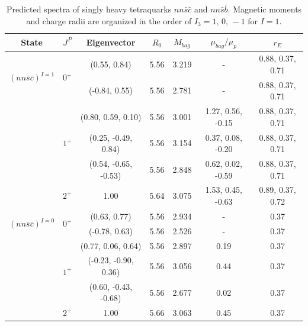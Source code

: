 \documentclass[prd,twocolumn,floatfix,nofootinbib]{revtex4}
\begin{document}
\renewcommand{\tabcolsep}{0.62cm}
\renewcommand{\arraystretch}{1.3}
\begin{table}[!htbp]
    \caption{Predicted spectra of singly heavy tetraquarks $nn\bar{s}\bar{c}$ and $nn\bar{s}\bar{b}$. 
    Magnetic moments and charge radii are organized in the order of $I_{3}=1,\,0,\,-1$ for $I=1$.}
    \label{tab:1heavytetraquark}
    \begin{tabular}{ccccccc}
        \hline\hline
        {\rm State}     &$J^{P}$    &{\rm Eigenvector}      &$R_{0}$    &$M_{bag}$  &$\mu_{bag}/\mu_{p}$    &$r_{E}$ \\ \hline
        \multirow{2}{*}{${(nn\bar{s}\bar{c})}^{I=1}$}
                        &\multirow{2}{*}{$0^{+}$}
                                    &(0.55, 0.84)           &5.56	    &3.219	    &-                      &0.88, 0.37, 0.71 \\ 
                        &           &(-0.84, 0.55)          &5.56	    &2.781	    &-                      &0.88, 0.37, 0.71 \\ 
                        &\multirow{3}{*}{$1^{+}$}
                                    &(0.80, 0.59, 0.10)     &5.56	    &3.001	    &1.27, 0.56, -0.15      &0.88, 0.37, 0.71 \\ 
                        &           &(0.25, -0.49, 0.84)    &5.56	    &3.154	    &0.37, 0.08, -0.20      &0.88, 0.37, 0.71 \\ 
                        &           &(0.54, -0.65, -0.53)   &5.56	    &2.848	    &0.62, 0.02, -0.59      &0.88, 0.37, 0.71 \\ 
                        &$2^{+}$    &1.00                   &5.64	    &3.075	    &1.53, 0.45, -0.63      &0.89, 0.37, 0.72 \\ 
        \multirow{2}{*}{${(nn\bar{s}\bar{c})}^{I=0}$}
                        &\multirow{2}{*}{$0^{+}$}
                                    &(0.63, 0.77)           &5.56	    &2.934	    &-                      &0.37 \\ 
                        &           &(-0.78, 0.63)          &5.56	    &2.526	    &-                      &0.37 \\ 
                        &\multirow{3}{*}{$1^{+}$}
                                    &(0.77, 0.06, 0.64)     &5.56	    &2.897	    &0.19                   &0.37 \\ 
                        &           &(-0.23, -0.90, 0.36)   &5.56	    &3.056	    &0.44                   &0.37 \\ 
                        &           &(0.60, -0.43, -0.68)   &5.56	    &2.677	    &0.02                   &0.37 \\ 
                        &$2^{+}$    &1.00                   &5.66	    &3.063	    &0.45                   &0.37 \\ 


\end{tabular}
\end{table}
\end{document}
